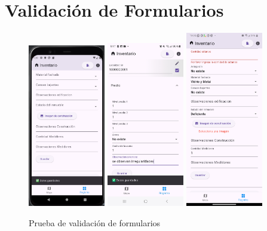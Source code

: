 \section{Validación de Formularios}
\begin{figure}[h]
    \includegraphics[width=0.3\textwidth]{Graphics/Capitulo 4/Pixel 4 [emulador]/4.4/1.png}
    \includegraphics[width=0.3\textwidth]{Graphics/Capitulo 4/Galaxy S23 Ultra Android/4.4/1.jpg}
    \includegraphics[width=0.3\textwidth]{Graphics/Capitulo 4/LG Android 13/4.4/2.png}
    \caption{Prueba de validación de formularios}
    \label{fig:figura20}
\end{figure}

